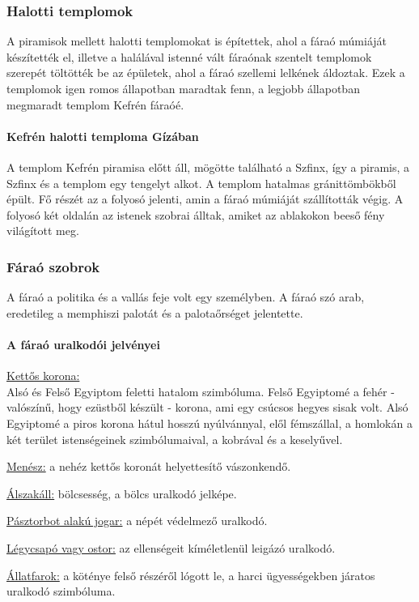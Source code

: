 \subsubsection*{Halotti templomok}

A piramisok mellett halotti templomokat is építettek, ahol a fáraó múmiáját készítették el, illetve a halálával istenné vált fáraónak szentelt templomok szerepét töltötték be az épületek, ahol a fáraó szellemi lelkének áldoztak. Ezek a templomok igen romos állapotban maradtak fenn, a legjobb állapotban megmaradt templom Kefrén fáraóé.

\paragraph{Kefrén halotti temploma Gízában}
A templom Kefrén piramisa előtt áll, mögötte található a Szfinx, így a piramis, a Szfinx és a templom egy tengelyt alkot. A templom hatalmas gránittömbökből épült. Fő részét az a folyosó jelenti, amin a fáraó múmiáját szállították végig. A folyosó két oldalán az istenek szobrai álltak, amiket az ablakokon beeső fény világított meg.

\subsubsection*{Fáraó szobrok}

A fáraó a politika és a vallás feje volt egy személyben. A fáraó szó arab, eredetileg a memphiszi palotát és a palotaőrséget jelentette.

\paragraph{A fáraó uralkodói jelvényei}

	\begin{compactitem}
		\item \underline{Kettős korona:}\\
		Alsó és Felső Egyiptom feletti hatalom szimbóluma. Felső Egyiptomé a fehér - valószínű, hogy ezüstből készült - korona, ami egy csúcsos hegyes sisak volt. Alsó Egyiptomé a piros korona hátul hosszú nyúlvánnyal, elől fémszállal, a homlokán a két terület istenségeinek szimbólumaival, a kobrával és a keselyűvel.
		
		\item \underline{Menész:} a nehéz kettős koronát helyettesítő vászonkendő.
		
		\item \underline{Álszakáll:} bölcsesség, a bölcs uralkodó jelképe.
		
		\item \underline{Pásztorbot alakú jogar:} a népét védelmező uralkodó.
		
		\item \underline{Légycsapó vagy ostor:} az ellenségeit kíméletlenül leigázó uralkodó.
		
		\item \underline{Állatfarok:} a köténye felső részéről lógott le, a harci ügyességekben járatos uralkodó szimbóluma.
	\end{compactitem}


